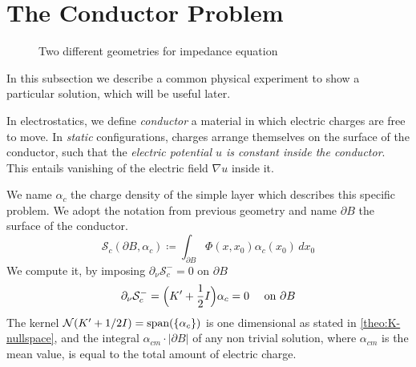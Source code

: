 \documentclass[10pt, a4paper, twoside, openright]{book}
\theoremstyle{definition}
\theoremstyle{plain}
\theoremstyle{plain}
\theoremstyle{plain}
\theoremstyle{plain}
\theoremstyle{plain}
\theoremstyle{plain}
\theoremstyle{plain}
\theoremstyle{plain}
\begin{document}
\section{The Conductor Problem}
\begin{figure}
\centering
{}
\caption{Two different geometries for impedance equation}
\label{fig:subfig}
\end{figure}
In this subsection we describe a common physical experiment to show a particular solution, which will be useful later.
\par
In electrostatics, we define \emph{conductor} a material in which electric charges are free to move. In \emph{static} configurations,
charges arrange themselves on the surface of the conductor, such that the \emph{electric potential $u$ is constant inside the conductor}. This entails vanishing of the electric field $\nabla u$ inside it.
\par
We name $\alpha_{c}$ the charge density of the simple layer which describes this specific problem. We adopt the notation from previous geometry and name $\partial B$ the surface of the conductor.
\begin{equation}
 \mathcal{S}_{c}(\partial B, \alpha_c)\coloneqq\int_{\partial B}\Phi(x,x_0)\alpha_{c}(x_0)\,dx_0
\end{equation}
We compute it, by imposing $\partial_\nu \mathcal{S}_{c}^- = 0$ on $\partial B$
\begin{equation}
 \partial_\nu\mathcal{S}_{c}^-=\Bigl(K'+\dfrac{1}{2}I\Bigr)\alpha_{c}= 0\quad\textup{ on }\partial B \label{eq:alpha_c-equation}
\end{equation}
The kernel $\mathcal{N}(K' + 1/2 I)=\textup{span}(\{\alpha_{c}\})$ is one dimensional as stated in \ref{theo:K-nullspace}, and the integral $\alpha_{cm} \cdot|\partial B|$ of any non trivial solution, where $\alpha_{cm}$ is the mean value, is equal to the total amount of electric charge.
\end{document}
